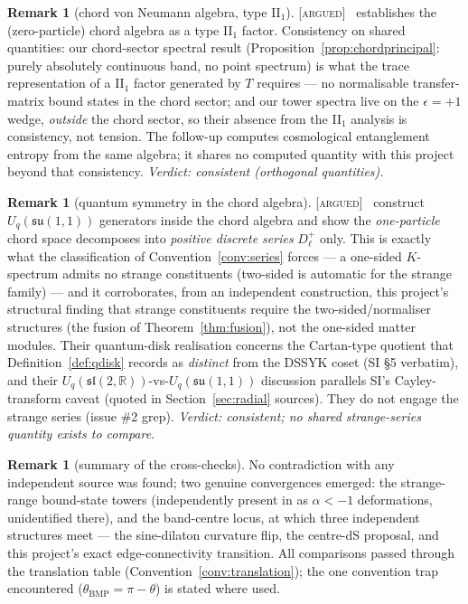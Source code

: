 \documentclass[11pt,a4paper]{article}
\newcommand{\ARGUED}{{\color{orange}\textsc{[argued]}}}
\theoremstyle{definition}
\newtheorem{remark}[definition]{Remark}
\theoremstyle{plain}
\newcommand{\Uq}{U_q(\mathfrak{su}(1,1))}
\newcommand{\R}{\mathbb{R}}
\begin{document}
\begin{remark}[chord von Neumann algebra, type II$_{1}$]\label{rem:xucheck}
\ARGUED\ \cite{Xu:2024vnalgebras} establishes the (zero-particle) chord algebra as a type
II$_{1}$ factor. Consistency on shared quantities: our chord-sector spectral result
(Proposition~\ref{prop:chordprincipal}: purely absolutely continuous band, no point
spectrum) is what the trace representation of a II$_{1}$ factor generated by $T$ requires
--- no normalisable transfer-matrix bound states in the chord sector; and our tower
spectra live on the $\epsilon=+1$ wedge, \emph{outside} the chord sector, so their
absence from the II$_{1}$ analysis is consistency, not tension. The follow-up
\cite{Aguilar:2025cosmological} computes cosmological entanglement entropy from the same
algebra; it shares no computed quantity with this project beyond that consistency.
\emph{Verdict: consistent (orthogonal quantities).}
\end{remark}

\begin{remark}[quantum symmetry in the chord algebra]\label{rem:vdhvxcheck}
\ARGUED\ \cite{vanderHeijden:2025quantum} construct $\Uq$ generators inside the chord
algebra and show the \emph{one-particle} chord space decomposes into \emph{positive
discrete series} $D^{+}_{\ell}$ only. This is exactly what the classification of
Convention~\ref{conv:series} forces --- a one-sided $K$-spectrum admits no strange
constituents (two-sided is automatic for the strange family) --- and it corroborates,
from an independent construction, this project's structural finding that strange
constituents require the two-sided/normaliser structures (the fusion of
Theorem~\ref{thm:fusion}), not the one-sided matter modules. Their quantum-disk
realisation concerns the Cartan-type quotient that Definition~\ref{def:qdisk} records as
\emph{distinct} from the DSSYK coset (SI \S5 verbatim), and their
$U_{q}(\mathfrak{sl}(2,\R))$-vs-$\Uq$ discussion parallels SI's Cayley-transform caveat
(quoted in Section~\ref{sec:radial} sources). They do not engage the strange series
(issue \#2 grep). \emph{Verdict: consistent; no shared strange-series quantity exists to
compare.}
\end{remark}

\begin{remark}[summary of the cross-checks]\label{rem:crosschecksummary}
No contradiction with any independent source was found; two genuine convergences emerged:
the strange-range bound-state towers (independently present in \cite{Aguilar:2026qaskey}
as $\alpha<-1$ deformations, unidentified there), and the band-centre locus, at which
three independent structures meet --- the sine-dilaton curvature flip, the centre-dS
proposal, and this project's exact edge-connectivity transition. All comparisons passed
through the translation table (Convention~\ref{conv:translation}); the one convention
trap encountered ($\theta_{\mathrm{BMP}}=\pi-\theta$) is stated where used.
\end{remark}
\end{document}
